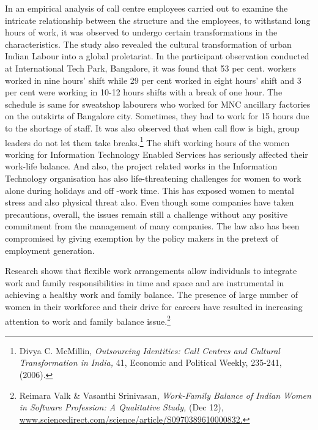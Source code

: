 \begin{multicols}{2}
\noi
In an empirical analysis of call centre employees carried out to examine the intricate
relationship between the structure and the employees, to withstand long hours of work, it was
observed to undergo certain transformations in the characteristics. The study also revealed the 
cultural transformation of urban Indian Labour into a global proletariat. In the participant
observation conducted at International Tech Park, Bangalore, it was found that 53 per cent.
workers worked in nine hours’ shift while 29 per cent worked in eight hours’ shift and 3 per
cent were working in 10-12 hours shifts with a break of one hour. The schedule is same for
sweatshop labourers who worked for MNC ancillary factories on the outskirts of Bangalore
city. Sometimes, they had to work for 15 hours due to the shortage of staff. It was also
observed that when call flow is high, group leaders do not let them take breaks.\footnote{Divya C. McMillin, \textit{Outsourcing Identities: Call Centres and Cultural Transformation in India,} 41, Economic and Political Weekly, 235-241, (2006).} The shift
working hours of the women working for Information Technology Enabled Services has
seriously affected their work-life balance. And also, the project related works in the
Information Technology organisation has also life-threatening challenges for women to work
alone during holidays and off -work time. This has exposed women to mental stress and also
physical threat also. Even though some companies have taken precautions, overall, the issues
remain still a challenge without any positive commitment from the management of many
companies. The law also has been compromised by giving exemption by the policy makers in
the pretext of employment generation.

\noi
Research shows that flexible work arrangements allow individuals to integrate work and
family responsibilities in time and space and are instrumental in achieving a healthy work and
family balance. The presence of large number of women in their workforce and their drive for
careers have resulted in increasing attention to work and family balance issue.\footnote{Reimara Valk \& Vasanthi Srinivasan, \textit{Work-Family Balance of Indian Women in Software Profession: A
Qualitative Study,} (Dec 12), \url{www.sciencedirect.com/science/article/S0970389610000832.}}



\end{multicols}
